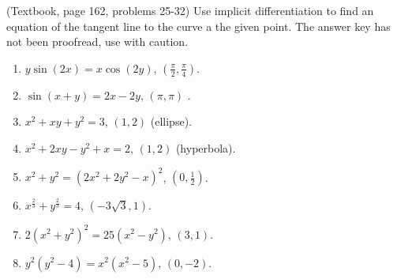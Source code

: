 (Textbook, page 162, problems 25-32) Use implicit differentiation to find an equation of the tangent line to the curve a the given point. The answer key has not been proofread, use with caution.
\begin{multicols}{3}
\begin{enumerate}
\item $y\sin (2x)=x\cos (2y) $, $\left(\frac{\pi}{2}, \frac{\pi}{4}\right)$. 
\answer{}
\item $ \sin (x+y)=2x-2y$, $(\pi,\pi)$ . 
\answer{}
\item $x^2+x y+y^2=3 $, $(1,2)$ (ellipse). 
\answer{}
\item $x^2+2x y-y^2+x=2 $, $(1,2)$ (hyperbola). 
\answer{}
\item $x^2+y^2=(2x^2+2y^2-x)^2 $, $(0,\frac{1}{2})$. 
\answer{}
\item $x^{\frac{2}{3}}+y^{\frac{2}{3}}=4$, $(-3\sqrt{3},1)$. 
\answer{}
\item $2(x^2+y^2)^2 =25(x^2-y^2)$, $(3,1)$. 
\answer{}
\item $y^2(y^2-4)=x^2(x^2-5) $, $(0,-2)$. 
\answer{}
\end{enumerate}
\end{multicols}
